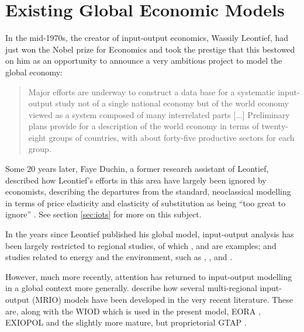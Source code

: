 \documentclass[a4paper]{article}
\begin{document}
\section{Existing Global Economic Models} \label{sec:litreview}
In the mid-1970s, the creator of input-output economics, Wassily Leontief, had just won the Nobel prize for Economics and took the prestige that this bestowed on him as an opportunity to announce a very ambitious project to model the global economy:

\begin{quotation}
Major efforts are underway to construct a data base for a systematic input-output study not of a single national economy but of the world economy viewed as a system composed of many interrelated parts [...]
Preliminary plans provide for a description of the world economy in terms of twenty-eight groups of countries, with about forty-five productive sectors for each group. 
\end{quotation}

Some 20 years later, Faye Duchin, a former research assistant of Leontief, described how Leontief's efforts in this area have largely been ignored by economists, describing the departures from the standard, neoclassical modelling in terms of price elasticity and elasticity of substitution as being ``too great to ignore'' \parencite{Duchin2004}. 
See section \ref{sec:iots} for more on this subject.

In the years since Leontief published his global model, input-output analysis has been largely restricted to regional studies, of which \textcite{Akita1993}, \textcite{Khan1999} and \textcite{Luo2013a} are examples; and studies related to energy and the environment, such as  \textcite{Leontief1970}, \textcite{Joshi1999}, \textcite{Bergh2002} and \textcite{Hendrickson2006}.

However, much more recently, attention has returned to input-output modelling in a global context more generally. \textcite{Tukker2013} describe how several multi-regional input-output (MRIO) models have been developed in the very recent literature.
These are, along with the WIOD which is used in the present model, EORA \parencite{Lenzen2012}, EXIOPOL \parencite{Tukker2013a} and the slightly more mature, but proprietorial GTAP \parencite{Walmsley2012}.
\end{document}
